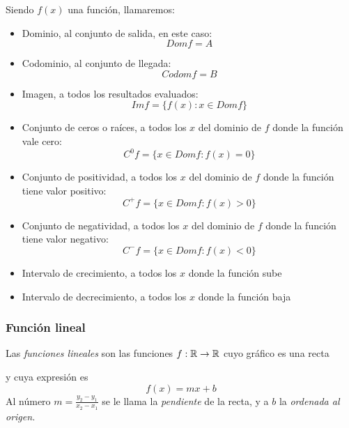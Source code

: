 \documentclass[../Teoría.root.tex]{subfiles}
\begin{document}
        Siendo \(f(x)\) una función, llamaremos:
        \begin{itemize}
            \item Dominio, al conjunto de salida, en este caso: \[Dom f=A\]
            \item Codominio, al conjunto de llegada: \[Codom f=B\]
            \item Imagen, a todos los resultados evaluados: \[Im f=\{f(x):x \in Dom f\}\]
            \item Conjunto de ceros o raíces, a todos los \(x\) del dominio de \(f\) donde la función vale cero: \[C^0 f=\{x\in Dom f:f(x)=0\}\]
            \item Conjunto de positividad, a todos los \(x\) del dominio de \(f\) donde la función tiene valor positivo: \[C^+ f=\{x\in Dom f:f(x) > 0\}\]
            \item Conjunto de negatividad, a todos los \(x\) del dominio de \(f\) donde la función tiene valor negativo: \[C^- f=\{x\in Dom f:f(x) < 0\}\]
            \item Intervalo de crecimiento, a todos los \(x\) donde la función sube
            \item Intervalo de decrecimiento, a todos los \(x\) donde la función baja
        \end{itemize}
        \subsubsection{Función lineal}
        Las \textit{funciones lineales} son las funciones \(f: \mathbb{R} \rightarrow \mathbb{R}\) cuyo gráfico es una recta
        \begin{center}
        \end{center}
        y cuya expresión es \[f(x)=mx+b\] Al número \(m = \frac{y_2-y_1}{x_2-x_1}\) se le llama la \textit{pendiente} de la recta, y a \(b\) la \textit{ordenada al origen.}
\end{document}
